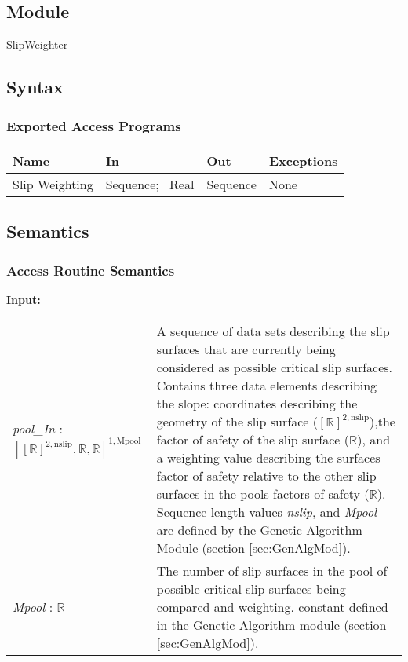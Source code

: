 \documentclass[12pt, titlepage]{article}
\begin{document}
\subsection{Module}
SlipWeighter

\subsection{Syntax}

\subsubsection{Exported Access Programs}
\begin{center}
\renewcommand*{\arraystretch}{1.5}
\begin{tabular}{| p{} | p{} | 
p{} | p{} |} \hline 

  \textbf{Name} & \textbf{In} & \textbf{Out} & \textbf{Exceptions}
  \\ \hline

  Slip Weighting & Sequence; ~\newline Real & Sequence & None
  \\ \hline
\end{tabular}
\end{center}

\subsection{Semantics}

\subsubsection{Access Routine Semantics}
\textbf{Input:} 
\renewcommand*{\arraystretch}{1.5}
\begin{longtable}{p{} p{}}
  \textit{pool\_In} : $[[\mathbb{R}]^{2,\text{nslip}}, \mathbb{R},
    \mathbb{R}]^{1,\text{Mpool}}$ & A sequence of data sets describing
  the slip surfaces that are currently being considered as possible
  critical slip surfaces. Contains three data elements describing the
  slope: coordinates describing the geometry of the slip surface
  ($[\mathbb{R}]^{2,\text{nslip}}$),the factor of safety of the slip
  surface ($\mathbb{R}$), and a weighting value describing the
  surfaces factor of safety relative to the other slip surfaces in the
  pools factors of safety ($\mathbb{R}$). Sequence length values
  \textit{nslip}, and \textit{Mpool} are defined by the Genetic
  Algorithm Module (section \ref{sec:GenAlgMod}). \\

  \textit{Mpool} : $\mathbb{R}$ & The number of slip surfaces in the
  pool of possible critical slip surfaces being compared and
  weighting. constant defined in the Genetic Algorithm module (section
  \ref{sec:GenAlgMod}).
\end{longtable}
\end{document}
